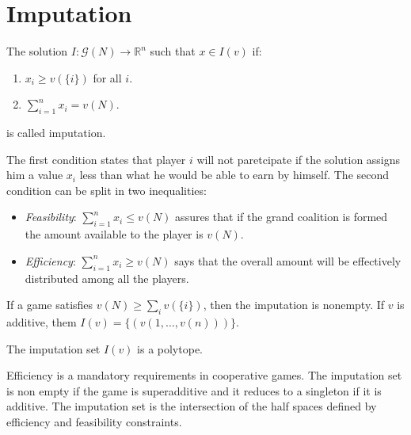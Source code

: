 \section{Imputation}

\begin{definition}
    The solution $I:\mathcal{G}(N)\rightarrow\mathbb{R}^n$ such that $x\in I(v)$ if: 
    \begin{enumerate}
        \item $x_i\geq v(\{i\})$ for all $i$. 
        \item $\sum_{i=1}^{n}x_i=v(N)$. 
    \end{enumerate}
    is called imputation. 
\end{definition}
\noindent The first condition states that player $i$ will not paretcipate if the solution assigns him a value $x_i$ less than what he would be able to earn by himself. 
The second condition can be split in two inequalities: 
\begin{itemize}
    \item \textit{Feasibility}: $\sum_{i=1}^{n}x_i\leq v(N)$ assures that if the grand coalition is formed the amount available to the player is $v(N)$. 
    \item \textit{Efficiency}: $\sum_{i=1}^{n}x_i\geq v(N)$ says that the overall amount will be effectively distributed among all the players. 
\end{itemize}
\noindent If a game satisfies $v(N)\geq\sum_iv(\{i\})$, then the imputation is nonempty. 
If $v$ is additive, them $I(v)=\{(v(1,\dots,v(n)))\}$. 
\begin{proposition}
    The imputation set $I(v)$ is a polytope. 
\end{proposition}
\noindent Efficiency is a mandatory requirements in cooperative games. 
The imputation set is non empty if the game is superadditive and it reduces to a singleton if it is additive. 
The imputation set is the intersection of the half spaces defined by efficiency and feasibility constraints. 